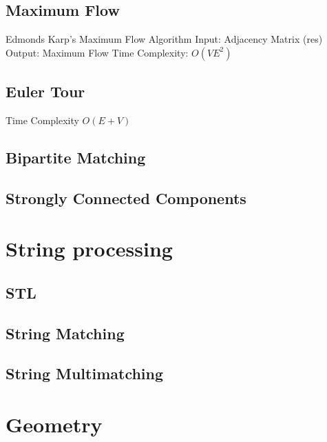 \documentclass[a4paper]{article}
\begin{document}
\begin{multicols}{3}
\subsection{Maximum Flow}
Edmonds Karp's Maximum Flow Algorithm \newline
Input:               Adjacency Matrix (res) \newline
Output:              Maximum Flow \newline
Time Complexity:     $O(VE^2)$



\subsection{Euler Tour}
Time Complexity $O(E + V)$


\subsection{Bipartite Matching}


\subsection{Strongly Connected Components}


\section{String processing}

\subsection{STL}


\subsection{String Matching}


\subsection{String Multimatching}


\section{Geometry}

\end{multicols}
\end{document}
